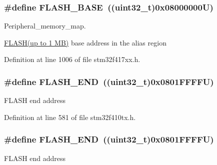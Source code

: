 \subsubsection[{\texorpdfstring{F\+L\+A\+S\+H\+\_\+\+B\+A\+SE}{FLASH_BASE}}]{\setlength{\rightskip}{0pt plus 5cm}\#define F\+L\+A\+S\+H\+\_\+\+B\+A\+SE~((uint32\+\_\+t)0x08000000\+U)}\hypertarget{group___peripheral__registers__structures_ga23a9099a5f8fc9c6e253c0eecb2be8db}{}\label{group___peripheral__registers__structures_ga23a9099a5f8fc9c6e253c0eecb2be8db}


Peripheral\+\_\+memory\+\_\+map. 

\hyperlink{group___peripheral__declaration_ga844ea28ba1e0a5a0e497f16b61ea306b}{F\+L\+A\+S\+H(up to 1 M\+B)} base address in the alias region 

Definition at line 1006 of file stm32f417xx.\+h.

\subsubsection[{\texorpdfstring{F\+L\+A\+S\+H\+\_\+\+E\+ND}{FLASH_END}}]{\setlength{\rightskip}{0pt plus 5cm}\#define F\+L\+A\+S\+H\+\_\+\+E\+ND~((uint32\+\_\+t)0x0801\+F\+F\+F\+F\+U)}\hypertarget{group___peripheral__registers__structures_ga8be554f354e5aa65370f6db63d4f3ee4}{}\label{group___peripheral__registers__structures_ga8be554f354e5aa65370f6db63d4f3ee4}
F\+L\+A\+SH end address 

Definition at line 581 of file stm32f410tx.\+h.

\subsubsection[{\texorpdfstring{F\+L\+A\+S\+H\+\_\+\+E\+ND}{FLASH_END}}]{\setlength{\rightskip}{0pt plus 5cm}\#define F\+L\+A\+S\+H\+\_\+\+E\+ND~((uint32\+\_\+t)0x0801\+F\+F\+F\+F\+U)}\hypertarget{group___peripheral__registers__structures_ga8be554f354e5aa65370f6db63d4f3ee4}{}\label{group___peripheral__registers__structures_ga8be554f354e5aa65370f6db63d4f3ee4}
F\+L\+A\+SH end address 

